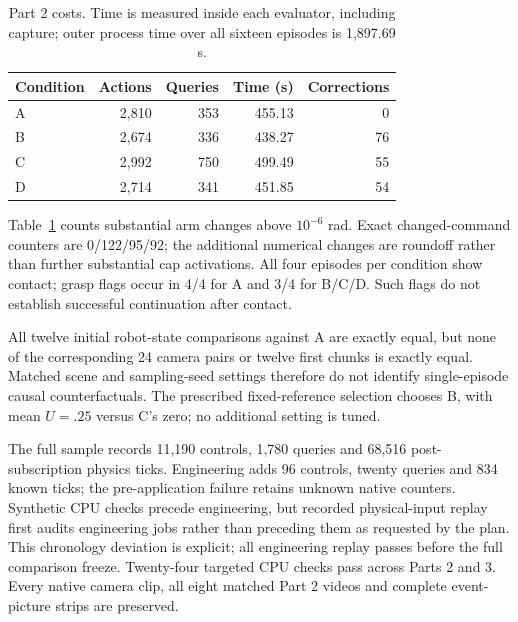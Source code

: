 \begin{table}[t]
\caption{Part 2 costs. Time is measured inside each evaluator, including capture;
outer process time over all sixteen episodes is 1,897.69 s.}
\label{tab:part2-costs}
\begin{tabular}{lrrrr}
\toprule
Condition & Actions & Queries & Time (s) & Corrections \\
\midrule
A & 2,810 & 353 & 455.13 & 0 \\
B & 2,674 & 336 & 438.27 & 76 \\
C & 2,992 & 750 & 499.49 & 55 \\
D & 2,714 & 341 & 451.85 & 54 \\
\bottomrule
\end{tabular}
\end{table}

Table~\ref{tab:part2-costs} counts substantial arm changes above $10^{-6}$ rad.
Exact changed-command counters are 0/122/95/92; the additional numerical changes
are roundoff rather than further substantial cap activations. All four episodes per
condition show contact; grasp flags occur in 4/4 for A and 3/4 for B/C/D. Such flags
do not establish successful continuation after contact.

All twelve initial robot-state comparisons against A are exactly equal, but none of
the corresponding 24 camera pairs or twelve first chunks is exactly equal. Matched
scene and sampling-seed settings therefore do not identify single-episode causal
counterfactuals. The prescribed fixed-reference selection chooses B, with mean
$U=.25$ versus C's zero; no additional setting is tuned.

The full sample records 11,190 controls, 1,780 queries and 68,516 post-subscription
physics ticks. Engineering adds 96 controls, twenty queries and 834 known ticks;
the pre-application failure retains unknown native counters. Synthetic CPU checks
precede engineering, but recorded physical-input replay first audits engineering
jobs rather than preceding them as requested by the plan. This chronology deviation
is explicit; all engineering replay passes before the full comparison freeze.
Twenty-four targeted CPU checks pass across Parts 2 and 3. Every native camera clip,
all eight matched Part 2 videos and complete event-picture strips are preserved.
